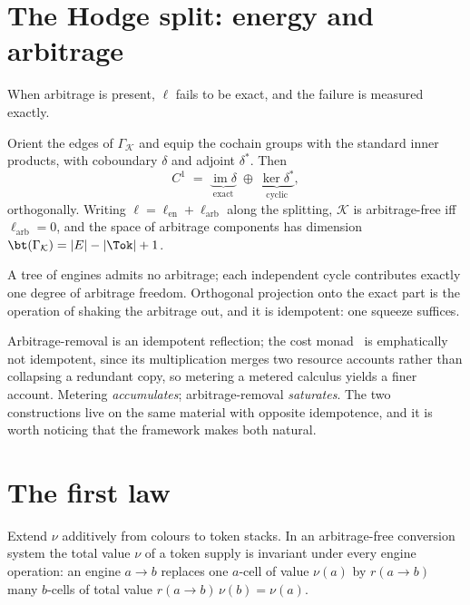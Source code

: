\section{The Hodge split: energy and arbitrage}

When arbitrage is present, $\ell$ fails to be exact, and the failure is
measured exactly.

\begin{proposition}
\label{prop:hodge}
Orient the edges of $\Gamma_{\mathcal K}$ and equip the cochain groups
with the standard inner products, with coboundary $\delta$ and adjoint
$\delta^{\ast}$.  Then
\[
  C^1 \;=\; \underbrace{\operatorname{im}\delta}_{\text{exact}}
        \;\oplus\; \underbrace{\ker\delta^{\ast}}_{\text{cyclic}},
\]
orthogonally.  Writing $\ell = \ell_{\mathrm{en}} + \ell_{\mathrm{arb}}$
along the splitting, $\mathcal{K}$ is arbitrage-free iff
$\ell_{\mathrm{arb}} = 0$, and the space of arbitrage components has
dimension $\bt(\Gamma_{\mathcal K}) = |E| - |\Tok| + 1$.
\end{proposition}

A tree of engines admits no arbitrage; each independent cycle contributes
exactly one degree of arbitrage freedom.  Orthogonal projection onto the
exact part is the operation of shaking the arbitrage out, and it is
idempotent: one squeeze suffices.

\begin{remark}
\label{rmk:twomonads}
Arbitrage-removal is an idempotent reflection; the cost
monad~\cite[\S9]{CE} is emphatically not idempotent, since its
multiplication merges two resource accounts rather than collapsing a
redundant copy, so metering a metered calculus yields a finer account.
Metering \emph{accumulates}; arbitrage-removal \emph{saturates}.  The two
constructions live on the same material with opposite idempotence, and it
is worth noticing that the framework makes both natural.
\end{remark}

\section{The first law}

\begin{proposition}
\label{prop:firstlaw}
Extend $\nu$ additively from colours to token stacks.  In an
arbitrage-free conversion system the total value $\nu$ of a token supply
is invariant under every engine operation: an engine $a \to b$ replaces
one $a$-cell of value $\nu(a)$ by $r(a\to b)$ many $b$-cells of total
value $r(a\to b)\,\nu(b) = \nu(a)$.
\end{proposition}


